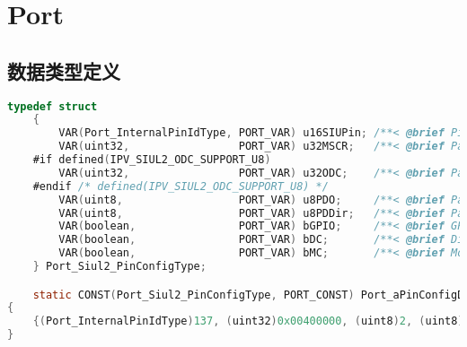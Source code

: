 \section{Port}

\subsection{数据类型定义}

\begin{lstlisting}[language=C,style=C]
    typedef struct
    {
        VAR(Port_InternalPinIdType, PORT_VAR) u16SIUPin; /**< @brief Pin Defined on Part SIUx */
        VAR(uint32,                 PORT_VAR) u32MSCR;   /**< @brief Pad Control Register */
    #if defined(IPV_SIUL2_ODC_SUPPORT_U8)
        VAR(uint32,                 PORT_VAR) u32ODC;    /**< @brief Pad Output Driver Control Configuration */
    #endif /* defined(IPV_SIUL2_ODC_SUPPORT_U8) */
        VAR(uint8,                  PORT_VAR) u8PDO;     /**< @brief Pad Data Output */
        VAR(uint8,                  PORT_VAR) u8PDDir;   /**< @brief Pad Data Direction */
        VAR(boolean,                PORT_VAR) bGPIO;     /**< @brief GPIO initial mode*/
        VAR(boolean,                PORT_VAR) bDC;       /**< @brief Direction changebility*/
        VAR(boolean,                PORT_VAR) bMC;       /**< @brief Mode changebility*/
    } Port_Siul2_PinConfigType;

    static CONST(Port_Siul2_PinConfigType, PORT_CONST) Port_aPinConfigDefault[PORT_MAX_CONFIGURED_PADS_U16]=
{
    {(Port_InternalPinIdType)137, (uint32)0x00400000, (uint8)2, (uint8)0, (boolean)FALSE, (boolean)FALSE, (boolean)FALSE}
}
\end{lstlisting}

